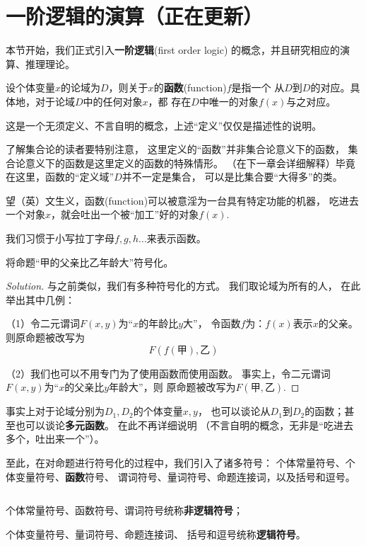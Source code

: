 \section{一阶逻辑的演算（正在更新）}

本节开始，我们正式引入\textbf{一阶逻辑}(first order logic)
的概念，并且研究相应的演算、推理理论。

\begin{definition}[函数与函数符号]
设个体变量$x$的论域为$D$，则关于$x$的\textbf{函数}(function)$f$是指一个
从$D$到$D$的对应。具体地，对于论域$D$中的任何对象$x$，都
存在$D$中唯一的对象$f(x)$与之对应。
\end{definition}

这是一个无须定义、不言自明的概念，上述“定义”仅仅是描述性的说明。

了解集合论的读者要特别注意，
这里定义的“函数”并非集合论意义下的函数，
集合论意义下的函数是这里定义的函数的特殊情形。
（在下一章会详细解释）毕竟在这里，函数的“定义域”$D$并不一定是集合，
可以是比集合要“大得多”的类。

望（英）文生义，函数(function)可以被意淫为一台具有特定功能的机器，
吃进去一个对象$x$，就会吐出一个被“加工”好的对象$f(x)$.

我们习惯于小写拉丁字母$f,g,h...$来表示函数。

\begin{example}
将命题“甲的父亲比乙年龄大”符号化。
\end{example}
\begin{proof}[Solution]
与之前类似，我们有多种符号化的方式。
我们取论域为所有的人，
在此举出其中几例：

（1）令二元谓词$F(x,y)$为“$x$的年龄比$y$大”，
令函数$f$为：$f(x)$表示$x$的父亲。
则原命题被改写为
$$F(f(\text{甲}),\text{乙})$$

（2）我们也可以不用专门为了使用函数而使用函数。
事实上，令二元谓词$F(x,y)$为“$x$的父亲比$y$年龄大”，则
原命题被改写为$F(\text{甲},\text{乙})$.
\end{proof}

事实上对于论域分别为$D_1,D_2$的个体变量$x,y$，
也可以谈论从$D_1$到$D_2$的函数；甚至也可以谈论\textbf{多元函数}。
在此不再详细说明
（不言自明的概念，无非是“吃进去多个，吐出来一个”）。\vs

至此，在对命题进行符号化的过程中，我们引入了诸多符号：
个体常量符号、个体变量符号、\textbf{函数}符号、
谓词符号、量词符号、命题连接词，以及括号和逗号。

\begin{definition}[逻辑符号与非逻辑符号]$\,$

个体常量符号、函数符号、谓词符号统称\textbf{非逻辑符号}；

个体变量符号、量词符号、命题连接词、
括号和逗号统称\textbf{逻辑符号}。
\end{definition}

